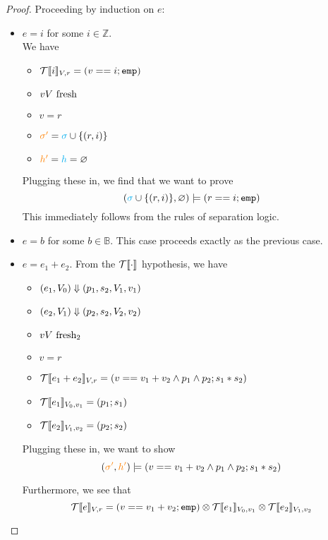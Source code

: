 \begin{proof}
  Proceeding by induction on $e$:
  \begin{itemize}
    \item $e = i$ for some $i \in \mathbb{Z}$.\\
      We have 
      \begin{itemize}
        \item $\mathcal{T}\llbracket i\rrbracket_{V,r} = (v == i ; \texttt{emp})$
        \item $v V \textrm{ fresh}$
        \item $v = r$
        \item ${\color{orange} \sigma'} = {\color{cyan} \sigma} \cup \{ (r,i) \}$
        \item ${\color{orange} h'} = {\color{cyan} h} = \varnothing$
      \end{itemize}
      Plugging these in, we find that we want to prove
      \[
        ({\color{cyan} \sigma} \cup \{ (r,i) \}, \varnothing) \models (r == i ; \texttt{emp})
      \]
      This immediately follows from the rules of separation logic.

    \item $e = b$ for some $b \in \mathbb{B}$. This case proceeds exactly as the previous case.

    \item $e = e_1 + e_2$.
      From the $\mathcal{T}\llbracket\cdot\rrbracket_{}$ hypothesis, we have
      \begin{itemize}
        \item $(e_1, V_0) \Downarrow (p_1, s_2, V_1, v_1)$
        \item $(e_2, V_1) \Downarrow (p_2, s_2, V_2, v_2)$
        \item $v V \textrm{ fresh}_2$
        \item $v = r$
        \item $\mathcal{T}\llbracket e_1 + e_2\rrbracket_{V, r} = (v == v_1 + v_2 \land p_1 \land p_2 ; s_1 * s_2)$
        \item $\mathcal{T}\llbracket e_1\rrbracket_{V_0,v_1} = (p_1 ; s_1)$
        \item $\mathcal{T}\llbracket e_2\rrbracket_{V_1,v_2} = (p_2 ; s_2)$
      \end{itemize}

      Plugging these in, we want to show
      \[
        ({\color{orange} \sigma'}, {\color{orange} h'}) \models (v == v_1 + v_2 \land p_1 \land p_2 ; s_1 * s_2)
      \]

      Furthermore, we see that
      \[
        \mathcal{T}\llbracket e\rrbracket_{V,r} = (v == v_1 + v_2 ; \texttt{emp}) \otimes \mathcal{T}\llbracket e_1\rrbracket_{V_0,v_1} \otimes \mathcal{T}\llbracket e_2\rrbracket_{V_1,v_2}
      \]


\end{itemize}
\end{proof}
